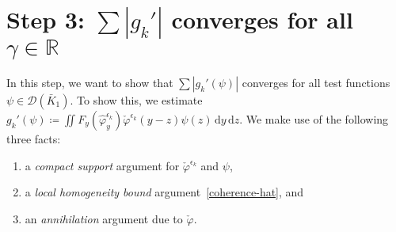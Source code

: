 \section{Step 3: \texorpdfstring{\(\sum |g_k'|\) converges for all \(\gamma \in \mathbb{R}\)}{Sum gk converges for all real gamma}}\label{chapter:step-3}

In this step, we want to show that \(\sum |g_k'(\psi)|\) converges for all test functions \(\psi \in \mathcal{D}(\bar K_1)\). To show this, we estimate \(g_k'(\psi) \coloneqq \iint F_y(\hat{\varphi}^{\epsilon_k}_{y}) \check \varphi^{\epsilon_k}(y-z) \psi(z) \, \mathrm{d}y \, \mathrm{d}z\). We make use of the following three facts: 
\begin{enumerate}
    \item a \emph{compact support} argument for \(\check \varphi^{\epsilon_k}\) and \(\psi\), 
    \item a \emph{local homogeneity bound} argument~\eqref{coherence-hat}, and
    \item an \emph{annihilation} argument due to \(\check \varphi\).
\end{enumerate}

